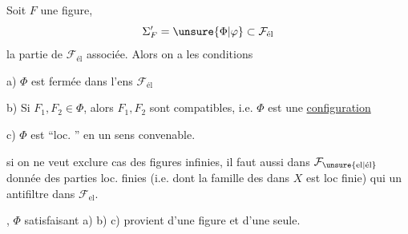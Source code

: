 Soit $F$ une figure, 
\[
\Sigma'_F=\unsure{\Phi|\varphi}\subset\mathcal{F}_{\text{él}}
\]
la partie de $\mathcal{F}_{\text{él}}$ associée. Alors on a les conditions

a) $\Phi$ est fermée dans l'ens  $\mathcal{F}_{\text{él}}$

b) Si  $F_1,F_2\in\Phi$,  alors $F_1,F_2$ sont compatibles, i.e. $\Phi$ est une \uline{configuration}

c) $\Phi$ est ``loc. '' en un sens convenable.

 si on ne veut exclure  cas des figures infinies, il faut aussi  dans $\mathcal{F}_{\unsure{\text{el}|\text{él}}}$  donnée des parties loc. finies (i.e. dont la famille des  dans $X$ est loc finie) qui  un antifiltre dans $\mathcal{F}_{\text{el}}$.

,  $\Phi$ satisfaisant a) b) c) provient d'une figure et d'une seule.
